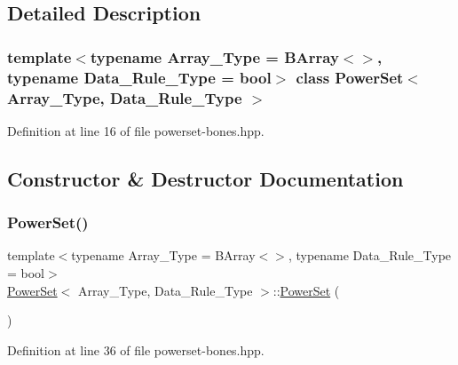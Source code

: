 \subsection{Detailed Description}
\subsubsection*{template$<$typename Array\+\_\+\+Type = B\+Array$<$$>$, typename Data\+\_\+\+Rule\+\_\+\+Type = bool$>$\newline
class Power\+Set$<$ Array\+\_\+\+Type, Data\+\_\+\+Rule\+\_\+\+Type $>$}



Definition at line 16 of file powerset-\/bones.\+hpp.



\subsection{Constructor \& Destructor Documentation}
\mbox{\label{class_power_set_a095815ccc44c88e0da73d92c6b5cf5f3}} 
\subsubsection{\texorpdfstring{Power\+Set()}{PowerSet()}\hspace{0.1cm}{\footnotesize\ttfamily [1/3]}}
{\footnotesize\ttfamily template$<$typename Array\+\_\+\+Type  = B\+Array$<$$>$, typename Data\+\_\+\+Rule\+\_\+\+Type  = bool$>$ \\
\hyperlink{class_power_set}{Power\+Set}$<$ Array\+\_\+\+Type, Data\+\_\+\+Rule\+\_\+\+Type $>$\+::\hyperlink{class_power_set}{Power\+Set} (\begin{DoxyParamCaption}{ }\end{DoxyParamCaption})\hspace{0.3cm}{\ttfamily [inline]}}



Definition at line 36 of file powerset-\/bones.\+hpp.

\mbox{\label{class_power_set_abf6ac4224da7ae4d187d0d63833615b1}} 

